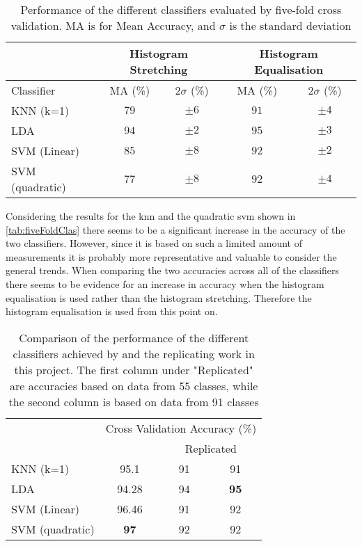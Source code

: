 \begin{table}[H]
\centering
\begin{tabular}{|l|c|c|c|c|}
\cline{2-5}
\multicolumn{1}{c|}{}&\multicolumn{2}{c|}{Histogram Stretching}&\multicolumn{2}{c|}{Histogram Equalisation}\\
\hline
Classifier&MA (\%)&$2\sigma$ (\%)&MA (\%)&$2\sigma$ (\%)\\
\hline
KNN (k=1)&$79$&$\pm 6$&$91$&$\pm4$\\
\hline
LDA&$94$&$\pm2$&$95$&$\pm3$\\
\hline
SVM (Linear)&$85$&$\pm8$&$92$&$\pm2$\\
\hline
SVM (quadratic)&$77$&$\pm8$&$92$&$\pm4$\\
\hline
\end{tabular}
\caption{Performance of the different classifiers evaluated by five-fold cross validation. MA is for Mean Accuracy, and $\sigma$ is the standard deviation}
\label{tab:fiveFoldClas}
\end{table} 
Considering the results for the \gls{knn} and the quadratic \gls{svm} shown in \autoref{tab:fiveFoldClas} there seems to be a significant increase in the accuracy of the two classifiers. However, since it is based on such a limited amount of measurements it is probably more representative and valuable to consider the general trends. When comparing the two accuracies across all of the classifiers there seems to be evidence for an increase in accuracy when the histogram equalisation is used rather than the histogram stretching. Therefore the histogram equalisation is used from this point on. 
\begin{table}[H]
\centering
\begin{tabular}{|l|c|c|c|}
\cline{2-4}
\multicolumn{1}{c|}{}&\multicolumn{3}{c|}{Cross Validation Accuracy (\%)}\\
\cline{2-4}
\multicolumn{1}{c|}{}&\cite{Khan2017a}&\multicolumn{2}{c|}{Replicated}\\
\hline
KNN (k=1)&95.1&91&91\\
\hline
LDA&94.28&94&\textbf{95}\\
\hline
SVM (Linear)&96.46&91&92\\
\hline
SVM (quadratic)&\textbf{97}&92&92\\
\hline
\end{tabular}
\caption{Comparison of the performance of the different classifiers achieved by \cite{Khan2017a} and the replicating work in this project. The first column under "Replicated" are accuracies based on data from 55 classes, while the second column is based on data from 91 classes}
\label{tab:fiveFoldClasCompare}
\end{table} 


